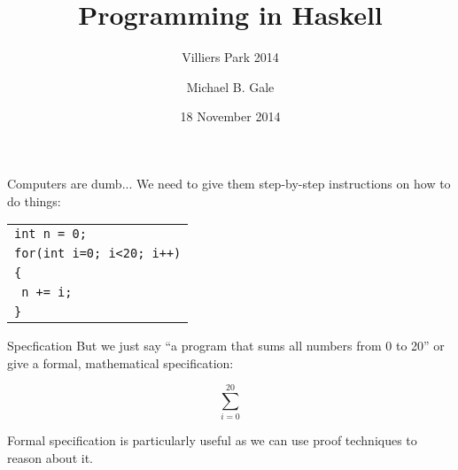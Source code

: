 \documentclass[aspectratio=43]{beamer}
\title{Programming in Haskell}
\subtitle{Villiers Park 2014}
\date{18 November 2014}
\author{Michael B. Gale}
\institute{Computer Laboratory, University of Cambridge}
\newcommand{\keyword}[1]{{\color{blue}#1}}
\begin{document}
\begin{frame}
\maketitle
\end{frame}

\begin{frame}{Computers are dumb...}
We need to give them step-by-step instructions on how to do things:\\[1cm]
\begin{tabular}[t]{l}
\texttt{\keyword{int} n = 0;} \\
\texttt{\keyword{for}(\keyword{int} i=0; i<20; i++)} \\
\texttt{\{} \\
\texttt{   n += i;}\\
\texttt{\}}
\end{tabular} 
\end{frame}

\begin{frame}{Specfication}
But we just say ``a program that sums all numbers from 0 to 20'' or give a formal, mathematical specification:
\begin{center}
\begin{displaymath}
\sum_{i=0}^{20}
\end{displaymath}
\end{center}
Formal specification is particularly useful as we can use proof techniques to reason about it.
\end{frame}

\end{document}
